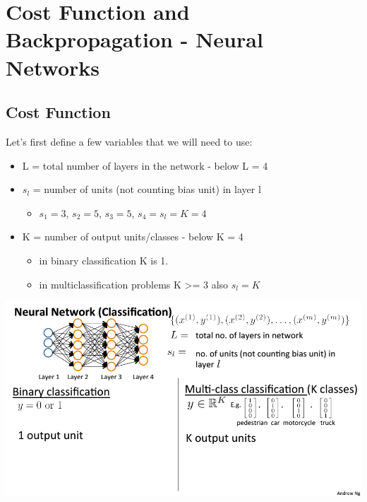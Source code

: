 \documentclass[
]{book}
\providecommand{\tightlist}{%
  \setlength{\itemsep}{0pt}\setlength{\parskip}{0pt}}
\begin{document}
\hypertarget{cost-function-and-backpropagation---neural-networks}{%
\section{Cost Function and Backpropagation - Neural Networks}\label{cost-function-and-backpropagation---neural-networks}}

\hypertarget{cost-function}{%
\subsection{Cost Function}\label{cost-function}}

Let's first define a few variables that we will need to use:

\begin{itemize}
\tightlist
\item
  L = total number of layers in the network - below L = 4
\item
  \(s_l\) = number of units (not counting bias unit) in layer l

  \begin{itemize}
  \tightlist
  \item
    \(s_1 = 3\), \(s_2 = 5\), \(s_3 = 5\), \(s_4 = s_l = K = 4\)
  \end{itemize}
\item
  K = number of output units/classes - below K = 4

  \begin{itemize}
  \tightlist
  \item
    in binary classification K is 1.
  \item
    in multiclassification problems K \textgreater= 3 also \(s_l = K\)
  \end{itemize}
\end{itemize}

\includegraphics{Neural Network cost fun.png}
\end{document}
